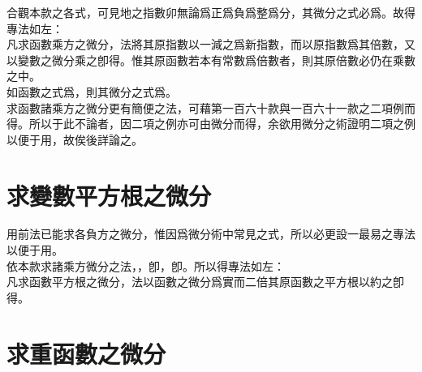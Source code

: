 \begin{enumerate} [label={第\chinese*款},nolistsep]
	合觀本款之各式，可見地之指數卯無論爲正爲負爲整爲分，其微分之式必爲\CJKmove。故得專法如左：\\
	凡求函數乘方之微分，法將其原指數以一減之爲新指數，而以原指數爲其倍數，又以變數之微分乘之卽得。惟其原函數若本有常數爲倍數者，則其原倍數必仍在乘數之中。\\
	如函數之式爲\CJKmove，則其微分之式爲\CJKmove。\\
	求函數諸乘方之微分更有簡便之法，可藉第一百六十款與一百六十一款之二項例而得。所以于此不論者，因二項之例亦可由微分而得，余欲用微分之術證明二項之例以便于用，故俟後詳論之。
\end{enumerate}

\section{求變數平方根之微分}

\setlength{\leftskip}{25pt}

\noindent
用前法已能求各負方之微分，惟因\CJKmove 爲微分術中常見之式，所以必更設一最易之專法以便于用。\\
依本款求諸乘方微分之法，\CJKmove，卽\CJKmove，卽\CJKmove。所以得專法如左：\\
凡求函數平方根之微分，法以函數之微分爲實而二倍其原函數之平方根以約之卽得。

\setlength{\leftskip}{0pt}

\section{求重函數之微分}

